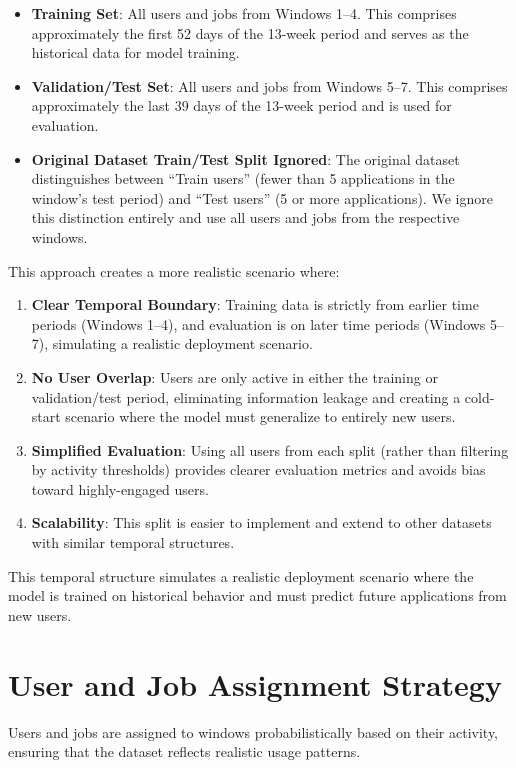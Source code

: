 \begin{itemize}
    \item \textbf{Training Set}: All users and jobs from Windows 1--4. This comprises approximately the first 52 days of the 13-week period and serves as the historical data for model training.
    
    \item \textbf{Validation/Test Set}: All users and jobs from Windows 5--7. This comprises approximately the last 39 days of the 13-week period and is used for evaluation.
    
    \item \textbf{Original Dataset Train/Test Split Ignored}: The original dataset distinguishes between ``Train users'' (fewer than 5 applications in the window's test period) and ``Test users'' (5 or more applications). We ignore this distinction entirely and use all users and jobs from the respective windows.
\end{itemize}

This approach creates a more realistic scenario where:
\begin{enumerate}
    \item \textbf{Clear Temporal Boundary}: Training data is strictly from earlier time periods (Windows 1--4), and evaluation is on later time periods (Windows 5--7), simulating a realistic deployment scenario.
    
    \item \textbf{No User Overlap}: Users are only active in either the training or validation/test period, eliminating information leakage and creating a cold-start scenario where the model must generalize to entirely new users.
    
    \item \textbf{Simplified Evaluation}: Using all users from each split (rather than filtering by activity thresholds) provides clearer evaluation metrics and avoids bias toward highly-engaged users.
    
    \item \textbf{Scalability}: This split is easier to implement and extend to other datasets with similar temporal structures.
\end{enumerate}

This temporal structure simulates a realistic deployment scenario where the model is trained on historical behavior and must predict future applications from new users.
\section{User and Job Assignment Strategy}
\label{sec:assignment_strategy}
Users and jobs are assigned to windows probabilistically based on their activity, ensuring that the dataset reflects realistic usage patterns.

